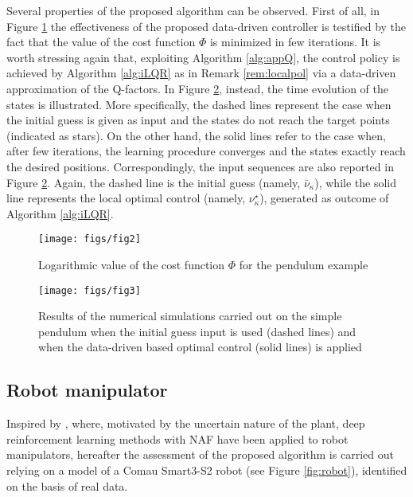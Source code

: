 \documentclass[10pt]{IEEEtran}      %
\theoremstyle{theorem}
\theoremstyle{remark}
\begin{document}
Several properties of the proposed algorithm can be observed. First of all,  in Figure \ref{fig:cost_pend} the effectiveness of the proposed data-driven controller is testified by the fact that the value of the cost function $\Phi$ is minimized in few iterations. It is worth stressing again that, exploiting Algorithm \ref{alg:appQ}, the control policy is achieved by Algorithm \ref{alg:iLQR} as in Remark \ref{rem:localpol} via a data-driven approximation of the Q-factors. In Figure \ref{fig:result_pend}, instead, the time evolution of the states is illustrated. More specifically, the dashed lines represent the case when the initial guess is given as input and the states do not reach the target points (indicated as stars). On the other hand, the solid lines refer to the case when, after few iterations, the learning procedure converges and the states exactly reach the desired positions. Correspondingly,  the input sequences are also reported in Figure \ref{fig:result_pend}. Again, the dashed line is the initial guess  (namely, $\bar{\nu}_\kappa$),  while the solid line represents the local optimal control (namely, $\nu_\kappa^{\star}$), generated as outcome of Algorithm \ref{alg:iLQR}.
\begin{figure}[htb!]
\center
\texttt{[image: figs/fig2]}
\caption{Logarithmic value of the cost function $\Phi$ for the pendulum example}
\label{fig:cost_pend}
\end{figure}
\begin{figure}[htb!]
\center
\texttt{[image: figs/fig3]}
\caption{Results of the numerical simulations carried out on the simple pendulum when the initial guess input is used (dashed lines) and when the data-driven based optimal control (solid lines) is applied}
\label{fig:result_pend}
\end{figure}


\subsection{Robot manipulator}
Inspired by \cite{sangiovanni2018deep}, where, motivated by the uncertain nature of the plant, deep reinforcement learning methods with NAF have been applied to robot manipulators, hereafter the assessment of the proposed algorithm is carried out relying on a model of a Comau Smart3-S2 robot (see Figure \ref{fig:robot}), identified on the basis of real data.
\end{document}
